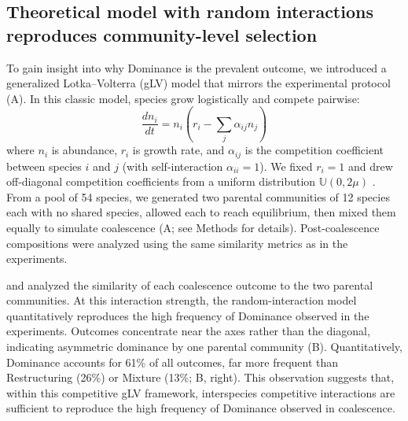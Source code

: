 \subsection{Theoretical model with random interactions reproduces community-level selection}
\label{sec:results:glv_model}
To gain insight into why Dominance is the prevalent outcome, we introduced a generalized Lotka--Volterra (gLV) model \citep{May1972, Grilli2017} that mirrors the experimental protocol (A). In this classic model, species grow logistically and compete pairwise:
\begin{equation}
\frac{dn_i}{dt} = n_i \left( r_i - \sum_j \alpha_{ij} n_j \right)
\label{eq:glv}
\end{equation}
where $n_i$ is abundance, $r_i$ is growth rate, and $\alpha_{ij}$ is the competition coefficient between species $i$ and $j$ (with self-interaction $\alpha_{ii} = 1$). We fixed $r_i = 1$ and drew off-diagonal competition coefficients from a uniform distribution $\mathbb{U}(0, 2\mu)$  \citep{Hu2022,Hu2025}. From a pool of 54 species, we generated two parental communities of 12 species each with no shared species, allowed each to reach equilibrium, then mixed them equally to simulate coalescence (A; see Methods for details). Post-coalescence compositions were analyzed using the same similarity metrics as in the experiments. 

 and analyzed the similarity of each coalescence outcome to the two parental communities. At this interaction strength, the random-interaction model quantitatively reproduces the high frequency of Dominance observed in the experiments. Outcomes concentrate near the axes rather than the diagonal, indicating asymmetric dominance by one parental community (B). Quantitatively, Dominance accounts for 61\% of all outcomes, far more frequent than Restructuring (26\%) or Mixture (13\%; B, right). This observation suggests that, within this competitive gLV framework, interspecies competitive interactions are sufficient to reproduce the high frequency of Dominance observed in coalescence.

